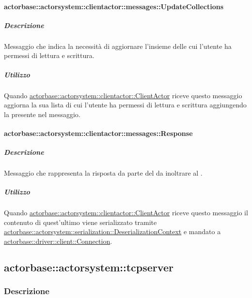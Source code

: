 \documentclass{scalatekids-article}
\begin{document}
\paragraph{actorbase::actorsystem::clientactor::messages::UpdateCollections}
\label{sec:actorbase::actorsystem::clientactor::messages::UpdateCollections}

\subparagraph{Descrizione}

Messaggio che indica la necessità di aggiornare l'insieme delle
 cui l'utente ha permessi di lettura e scrittura.

\subparagraph{Utilizzo}

Quando \hyperref[sec:actorbase::actorsystem::clientactor::ClientActor]{actorbase::actorsystem::clientactor::ClientActor}
riceve questo messaggio aggiorna la sua lista di 
cui l'utente ha permessi di lettura e scrittura aggiungendo
la  presente nel messaggio.

\paragraph{actorbase::actorsystem::clientactor::messages::Response}
\label{sec:actorbase::actorsystem::clientactor::messages::Response}

\subparagraph{Descrizione}

Messaggio che rappresenta la risposta da parte del  da inoltrare
al .

\subparagraph{Utilizzo}

Quando \hyperref[sec:actorbase::actorsystem::clientactor::ClientActor]{actorbase::actorsystem::clientactor::ClientActor}
riceve questo messaggio il contenuto di quest'ultimo viene serializzato tramite
\hyperref[sec:actorbase::actorsystem::serialization::DeserializationContext]{actorbase::actorsystem::serialization::DeserializationContext}
e mandato a \hyperref[sec:actorbase::driver::client::Connection]{actorbase::driver::\allowbreak{}client::\allowbreak{}Connection}.

\subsection{actorbase::actorsystem::tcpserver}
\label{sec:actorbase::actorsystem::tcpserver}

\subsubsection{Descrizione}
\end{document}
